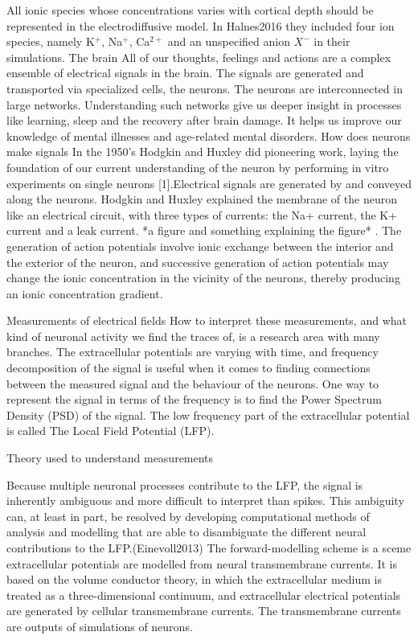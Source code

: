 \documentclass{uiophd}
\begin{document}
All ionic species whose concentrations varies with cortical depth should be represented in the electrodiffusive model. In Halnes2016 they included four ion species, namely K$^+$, Na$^+$, Ca$^{2+}$ and an unspecified anion $X^-$ in their simulations.
{The brain}
All of our thoughts, feelings and actions are a complex ensemble of electrical signals in the brain. The signals are generated and transported via specialized cells, the neurons. The neurons are interconnected in large networks. Understanding such networks give us deeper insight in processes like learning, sleep and the recovery after brain damage. It helps us improve our knowledge of mental illnesses and age-related mental disorders.
{How does neurons make signals}
In the 1950’s Hodgkin and Huxley did pioneering work, laying the foundation of our current understanding of the neuron by performing in vitro experiments on single neurons [1].Electrical signals are generated by and conveyed along the neurons. Hodgkin and Huxley explained the membrane of the neuron like an electrical circuit, with three types of currents: the Na+ current, the K+ current and a leak current. *a figure and something explaining the figure* . The generation of action potentials involve ionic exchange between the interior and the exterior of the neuron, and successive generation of action potentials may change the ionic concentration in the vicinity of the neurons, thereby producing an ionic concentration gradient.

{Measurements of electrical fields}
 How to interpret these measurements, and what kind of neuronal activity we find the traces of, is a research area with many branches. The extracellular potentials are varying with time, and frequency decomposition of the signal is useful when it comes to finding connections between the measured signal and the behaviour of the neurons. One way to represent the signal in terms of the frequency is to find the Power Spectrum Density (PSD) of the signal. The low frequency part of the extracellular potential is called The Local Field Potential (LFP). 

{Theory used to understand measurements}

Because multiple neuronal processes contribute to the LFP, the signal is inherently ambiguous and more difficult to interpret than spikes. This ambiguity can, at least in part, be resolved by developing computational methods of analysis and modelling that are able to disambiguate the different
neural contributions to the LFP.(Einevoll2013)  The forward-modelling scheme is a sceme extracellular potentials are modelled from neural
transmembrane currents. It is based on the volume conductor theory, in which the extracellular medium is treated as a
three-dimensional continuum, and extracellular electrical potentials are
generated by cellular transmembrane currents. The transmembrane currents are outputs of simulations of neurons.
\end{document}
